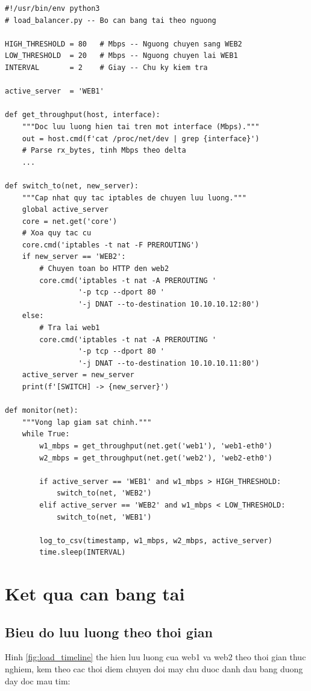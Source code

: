 \begin{lstlisting}
#!/usr/bin/env python3
# load_balancer.py -- Bo can bang tai theo nguong

HIGH_THRESHOLD = 80   # Mbps -- Nguong chuyen sang WEB2
LOW_THRESHOLD  = 20   # Mbps -- Nguong chuyen lai WEB1
INTERVAL       = 2    # Giay -- Chu ky kiem tra

active_server  = 'WEB1'

def get_throughput(host, interface):
    """Doc luu luong hien tai tren mot interface (Mbps)."""
    out = host.cmd(f'cat /proc/net/dev | grep {interface}')
    # Parse rx_bytes, tinh Mbps theo delta
    ...

def switch_to(net, new_server):
    """Cap nhat quy tac iptables de chuyen luu luong."""
    global active_server
    core = net.get('core')
    # Xoa quy tac cu
    core.cmd('iptables -t nat -F PREROUTING')
    if new_server == 'WEB2':
        # Chuyen toan bo HTTP den web2
        core.cmd('iptables -t nat -A PREROUTING '
                 '-p tcp --dport 80 '
                 '-j DNAT --to-destination 10.10.10.12:80')
    else:
        # Tra lai web1
        core.cmd('iptables -t nat -A PREROUTING '
                 '-p tcp --dport 80 '
                 '-j DNAT --to-destination 10.10.10.11:80')
    active_server = new_server
    print(f'[SWITCH] -> {new_server}')

def monitor(net):
    """Vong lap giam sat chinh."""
    while True:
        w1_mbps = get_throughput(net.get('web1'), 'web1-eth0')
        w2_mbps = get_throughput(net.get('web2'), 'web2-eth0')

        if active_server == 'WEB1' and w1_mbps > HIGH_THRESHOLD:
            switch_to(net, 'WEB2')
        elif active_server == 'WEB2' and w1_mbps < LOW_THRESHOLD:
            switch_to(net, 'WEB1')

        log_to_csv(timestamp, w1_mbps, w2_mbps, active_server)
        time.sleep(INTERVAL)
\end{lstlisting}

\section{Ket qua can bang tai}

\subsection{Bieu do luu luong theo thoi gian}

Hinh \ref{fig:load_timeline} the hien luu luong cua web1 va web2 theo thoi gian thuc nghiem, kem theo cac thoi diem chuyen doi may chu duoc danh dau bang duong day doc mau tim:

